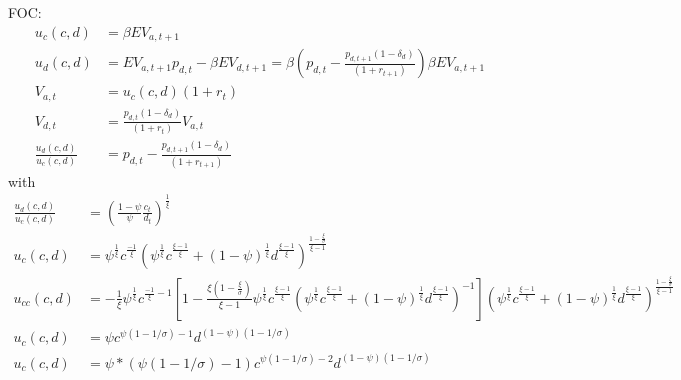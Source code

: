 \documentclass[11pt]{article}
\begin{document}
FOC:
\begin{align*}
	u_c(c,d) &= \beta E V_{a,t+1} \\
	u_d(c,d) &=  E V_{a,t+1} p_{d,t} - \beta E V_{d,t+1} = \beta  \left(p_{d,t} - \frac{p_{d,{t+1}}(1-\delta_d)}{(1+r_{t+1})}\right) \beta E V_{a,t+1}  \\
	V_{a,t} &= u_c(c,d) (1+r_t)  \\
	V_{d,t} &= \frac{p_{d,t}(1-\delta_d)}{(1+r_{t})}V_{a,t} \\
	\frac{u_d(c,d)}{u_c(c,d)}&=p_{d,t} - \frac{p_{d,{t+1}}(1-\delta_d)}{(1+r_{t+1})}
\end{align*}
with
\begin{align*}
	\frac{u_d(c,d)}{u_c(c,d)}&=\left(\frac{1-\psi}{\psi}\frac{c_t}{d_t}\right)^{\frac{1}{\xi}} \\
	u_c(c,d)&= \psi^{\frac{1}{\xi}} c^{\frac{-1}{\xi}} \left(\psi^{\frac{1}{\xi}} c^{\frac{\xi-1}{\xi}} + (1-\psi)^{\frac{1}{\xi}} d^{\frac{\xi-1}{\xi}}\right)^{\frac{1-\frac{\xi}{\sigma}}{\xi-1}} \\
	u_{cc}(c,d)&= -\frac{1}{\xi}\psi^{\frac{1}{\xi}} c^{\frac{-1}{\xi}-1}\left[1     - \frac{\xi(1-\frac{\xi}{\sigma})}{\xi-1}\psi^{\frac{1}{\xi}} c^{\frac{\xi-1}{\xi}}  \left(\psi^{\frac{1}{\xi}} c^{\frac{\xi-1}{\xi}} + (1-\psi)^{\frac{1}{\xi}} d^{\frac{\xi-1}{\xi}}\right)^{-1} \right]\left(\psi^{\frac{1}{\xi}} c^{\frac{\xi-1}{\xi}} + (1-\psi)^{\frac{1}{\xi}} d^{\frac{\xi-1}{\xi}}\right)^{\frac{1-\frac{\xi}{\sigma}}{\xi-1}} \\
	u_c(c,d)&= \psi c^{\psi(1-1/\sigma) - 1} d^{(1-\psi)(1-1/\sigma)} \\
	u_c(c,d)&= \psi * (\psi(1-1/\sigma) - 1) c^{\psi(1-1/\sigma) - 2} d^{(1-\psi)(1-1/\sigma)}
\end{align*}
\end{document}
